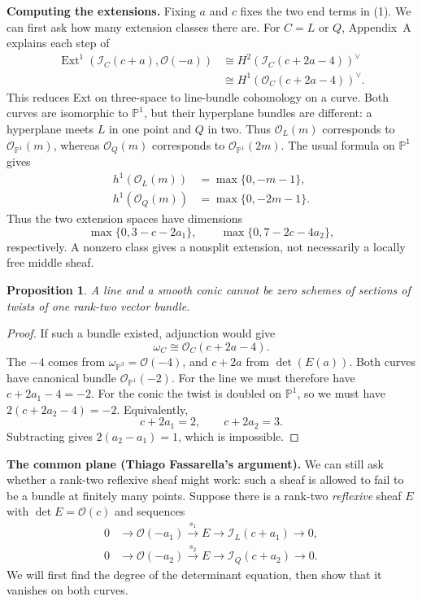 \documentclass[11pt,a4paper]{article}
\newtheorem{proposition}{Proposition}[section]
\theoremstyle{remark}
\begin{document}
\textbf{Computing the extensions.}
Fixing $a$ and $c$ fixes the two end
terms in (1). We can first ask how
many extension classes there are.
For $C=L$ or $Q$, Appendix~A explains
each step of
$$
\begin{aligned}
\operatorname{Ext}^1
(\mathcal{I}_C(c+a),\mathcal{O}(-a))
&\cong H^2(\mathcal{I}_C(c+2a-4))^\vee\\
&\cong H^1(\mathcal{O}_C(c+2a-4))^\vee.
\end{aligned}
$$
This reduces Ext on three-space to
line-bundle cohomology on a curve.
Both curves are isomorphic to
$\mathbb{P}^1$, but their hyperplane
bundles are different: a hyperplane
meets $L$ in one point and $Q$ in two.
Thus $\mathcal{O}_L(m)$ corresponds to
$\mathcal{O}_{\mathbb{P}^1}(m)$, whereas
$\mathcal{O}_Q(m)$ corresponds to
$\mathcal{O}_{\mathbb{P}^1}(2m)$.
The usual formula on $\mathbb{P}^1$ gives
$$
\begin{aligned}
h^1(\mathcal{O}_L(m))&=\max\{0,-m-1\},\\
h^1(\mathcal{O}_Q(m))&=\max\{0,-2m-1\}.
\end{aligned}
$$
Thus the two extension spaces have
dimensions
$$
\max\{0,3-c-2a_1\},\qquad
\max\{0,7-2c-4a_2\},
$$
respectively. A nonzero class gives
a nonsplit extension, not necessarily
a locally free middle sheaf.

\begin{proposition}
A line and a smooth conic cannot be
zero schemes of sections of twists
of one rank-two vector bundle.
\end{proposition}
\begin{proof}
If such a bundle existed, adjunction
would give
$$
\omega_C\cong\mathcal{O}_C(c+2a-4).
$$
The $-4$ comes from
$\omega_{\mathbb{P}^3}=\mathcal{O}(-4)$,
and $c+2a$ from $\det(E(a))$.
Both curves have canonical bundle
$\mathcal{O}_{\mathbb{P}^1}(-2)$.
For the line we must therefore have
$c+2a_1-4=-2$.
For the conic the twist is doubled on
$\mathbb{P}^1$, so we must have
$2(c+2a_2-4)=-2$.
Equivalently,
$$
c+2a_1=2,\qquad c+2a_2=3.
$$
Subtracting gives $2(a_2-a_1)=1$,
which is impossible.
\end{proof}

\textbf{The common plane
(Thiago Fassarella's argument).}
We can still ask whether a rank-two
reflexive sheaf might work: such a
sheaf is allowed to fail to be a
bundle at finitely many points.
Suppose there is a rank-two
\emph{reflexive} sheaf $E$ with
$\det E=\mathcal{O}(c)$ and sequences
\begin{equation}
\begin{aligned}
0&\longrightarrow\mathcal{O}(-a_1)
\xrightarrow{s_1}E
\longrightarrow\mathcal{I}_L(c+a_1)
\longrightarrow0,\\
0&\longrightarrow\mathcal{O}(-a_2)
\xrightarrow{s_2}E
\longrightarrow\mathcal{I}_Q(c+a_2)
\longrightarrow0.
\end{aligned}
\end{equation}
We will first find the degree of the
determinant equation, then show that
it vanishes on both curves.
\end{document}

